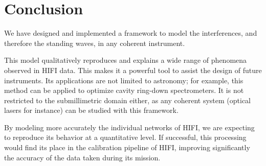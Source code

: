\documentclass[journal]{IEEEtran}
\begin{document}

\section{Conclusion}
We have designed and implemented a framework to model the interferences, and therefore the standing waves, in any coherent instrument.

This model qualitatively reproduces and explains a wide range of phenomena observed in HIFI data.
This makes it a powerful tool to assist the design of future instruments.
Its applications are not limited to astronomy; for example, this method can be applied to optimize cavity ring-down spectrometers.
It is not restricted to the submillimetric domain either, as any coherent system (optical lasers for instance) can be studied with this framework.

By modeling more accurately the individual networks of HIFI, we are expecting to reproduce its behavior at a quantitative level.
If successful, this processing would find its place in the calibration pipeline of HIFI, improving significantly the accuracy of the data taken during its mission.


%
%

\end{document}
